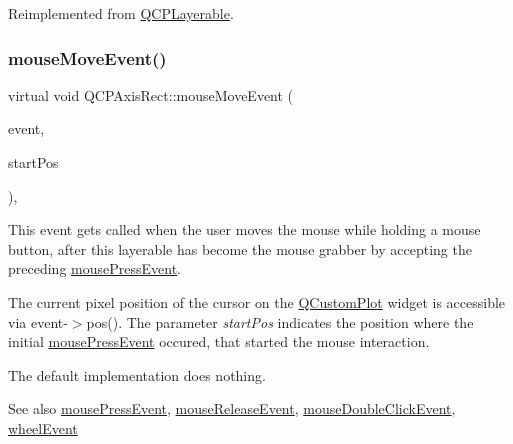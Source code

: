 Reimplemented from \hyperlink{class_q_c_p_layerable_a9eee1ba47fd69be111059ca3881933e4}{Q\+C\+P\+Layerable}.

\mbox{\label{class_q_c_p_axis_rect_a96e89068c5d9859f777d269fc277667a}} 
\subsubsection{\texorpdfstring{mouse\+Move\+Event()}{mouseMoveEvent()}\hspace{0.1cm}{\footnotesize\ttfamily [2/2]}}
{\footnotesize\ttfamily virtual void Q\+C\+P\+Axis\+Rect\+::mouse\+Move\+Event (\begin{DoxyParamCaption}\item[{Q\+Mouse\+Event $\ast$}]{event,  }\item[{const Q\+PointF \&}]{start\+Pos }\end{DoxyParamCaption})\hspace{0.3cm}{\ttfamily [protected]}, {\ttfamily [virtual]}}

This event gets called when the user moves the mouse while holding a mouse button, after this layerable has become the mouse grabber by accepting the preceding \hyperlink{class_q_c_p_axis_rect_aa9a7c807eaa4666870ac94aa6abc4dde}{mouse\+Press\+Event}.

The current pixel position of the cursor on the \hyperlink{class_q_custom_plot}{Q\+Custom\+Plot} widget is accessible via {\ttfamily event-\/$>$pos()}. The parameter {\itshape start\+Pos} indicates the position where the initial \hyperlink{class_q_c_p_axis_rect_aa9a7c807eaa4666870ac94aa6abc4dde}{mouse\+Press\+Event} occured, that started the mouse interaction.

The default implementation does nothing.

\begin{DoxySeeAlso}{See also}
\hyperlink{class_q_c_p_axis_rect_aa9a7c807eaa4666870ac94aa6abc4dde}{mouse\+Press\+Event}, \hyperlink{class_q_c_p_axis_rect_a6c89b988d3a0b93c0878f0ebdb5037f4}{mouse\+Release\+Event}, \hyperlink{class_q_c_p_layerable_a4171e2e823aca242dd0279f00ed2de81}{mouse\+Double\+Click\+Event}, \hyperlink{class_q_c_p_axis_rect_a93eeaa0c127d6d6fe8171b2455080262}{wheel\+Event} 
\end{DoxySeeAlso}


